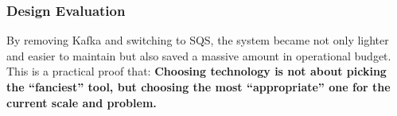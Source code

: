 \hypertarget{design-evaluation}{%
\subsubsection{Design Evaluation}}

By removing Kafka and switching to SQS, the system became not only
lighter and easier to maintain but also saved a massive amount in
operational budget. This is a practical proof that: \textbf{Choosing
technology is not about picking the ``fanciest'' tool, but choosing the
most ``appropriate'' one for the current scale and problem.}
